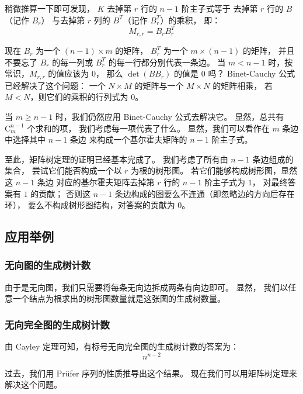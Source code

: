 \documentclass[UTF8]{article}
\begin{document}
	稍微推算一下即可发现，
	$K$ 去掉第 $r$ 行的 $n - 1$ 阶主子式等于
	去掉第 $r$ 行的 $B$（记作 $B_r$） 
	与去掉第 $r$ 列的 $B^T$（记作 $B^T_r$）的乘积，
	即：
	$$
	M_{r, r} = B_r B^T_r
	$$

	现在 $B_r$ 为一个 $(n - 1) \times m$ 的矩阵，
	$B^T_r$ 为一个 $m \times (n - 1)$ 的矩阵，
	并且不要忘了 $B_r$ 的每一列或 $B^T_r$ 的每一行都分别代表一条边。
	当 $m < n - 1$ 时，按常识，$M_{r, r}$ 的值应该为 $0$，
	那么 $\det(B B_r)$ 的值是 $0$ 吗？
	Binet-Cauchy 公式已经解决了这个问题：
	一个 $N \times M$ 的矩阵与一个 $M \times N$ 的矩阵相乘，
	若 $M < N$，则它们的乘积的行列式为 $0$。 

	当 $m \ge n - 1$ 时，我们仍然应用 Binet-Cauchy 公式去解决它。
	显然，总共有 $\mathrm{C}_{m}^{n - 1}$ 个求和的项，
	我们考虑每一项代表了什么。
	显然，我们可以看作在 $m$ 条边中选择其中 $n - 1$ 条边
	来构成一个基尔霍夫矩阵的 $n - 1$ 阶主子式。
	
	\bigskip

	至此，矩阵树定理的证明已经基本完成了。
	我们考虑了所有由 $n - 1$ 条边组成的集合，
	尝试它们能否构成一个以 $r$ 为根的树形图。
	若它们能够构成树形图，显然这 $n - 1$ 条边
	对应的基尔霍夫矩阵去掉第 $r$ 行的 $n - 1$ 阶主子式为 $1$，
	对最终答案有 $1$ 的贡献；
	否则这 $n - 1$ 条边构成的图要么不连通（即忽略边的方向后存在环），
	要么不构成树形图结构，对答案的贡献为 $0$。
	
	\bigskip

	{}

	\subsection{应用举例}

	\subsubsection{无向图的生成树计数}
	
	由于是无向图，我们只需要将每条无向边拆成两条有向边即可。
	显然，
	我们以任意一个结点为根求出的树形图数量就是这张图的生成树数量。

	\subsubsection{无向完全图的生成树计数}

	由 Cayley 定理可知，有标号无向完全图的生成树计数的答案为：
	$$
	n^{n - 2}
	$$

	过去，我们用 Prüfer 序列的性质推导出这个结果。
	现在我们可以用矩阵树定理来解决这个问题。
\end{document}
